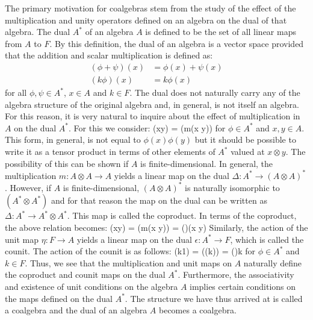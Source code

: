 The primary motivation for coalgebras stem from the study of the effect of the multiplication and unity
operators defined on an algebra on the dual of that algebra. The dual $A^*$ of an algebra $A$
is defined to be the set of all linear maps from $A$ to $F$. By this definition, the dual
of an algebra is a vector space provided that the addition and scalar multiplication is
defined as:
\begin{align}
(\phi + \psi)(x) & = \phi(x) + \psi(x) \\
(k\phi)(x) & = k \phi(x)
\end{align}
for all $\phi, \psi \in A^*$, $x \in A$ and $k \in F$. The dual does not
naturally carry any of the algebra structure of the original algebra and, in general,
is not itself an algebra. For this
reason, it is very natural to inquire about the effect of multiplication in $A$ on
the dual $A^*$. For this we consider:
\beq
\phi(xy) = \phi(m(x \otimes y))
\eeq
for $\phi \in A^*$ and $x,y \in A$. This form, in general, is not equal to $\phi(x) \phi(y)$
but it should be possible
to write it as a tensor product in terms of other elements of $A^*$ valued at $x \otimes y$. The
possibility of this can be shown if $A$ is finite-dimensional. In general, the multiplication
$m: A \otimes A \rightarrow A$ yields a linear map on the dual $\Delta: A^* \rightarrow
(A \otimes A)^*$. However, if $A$ is finite-dimensional, $(A \otimes A)^*$ is naturally isomorphic
to $(A^* \otimes A^*)$ and for that reason the map on the dual can be written as $\Delta: A^*
\rightarrow A^* \otimes A^*$. This map is called the coproduct. In terms of the coproduct, the
above relation becomes:
\beq
\phi(xy) = \phi(m(x \otimes y)) = \Delta(\phi)(x \otimes y)
\eeq
Similarly, the action of the unit map $\eta: F \rightarrow A$ yields a linear map on the
dual $\epsilon: A^* \rightarrow F$, which is called the counit. The action of the counit is
as follows:
\beq
\phi(k1) = \phi(\eta(k)) = \epsilon(\phi)k
\eeq
for $\phi \in A^*$ and $k \in F$. Thus, we see that the multiplication and unit maps on $A$
naturally define the coproduct and counit maps on the dual $A^*$. Furthermore, the associativity
and existence of unit conditions on the algebra $A$ implies certain conditions on the maps defined
on the dual $A^*$. The structure we have thus arrived at is called a coalgebra and the dual
of an algebra $A$ becomes a coalgebra.


